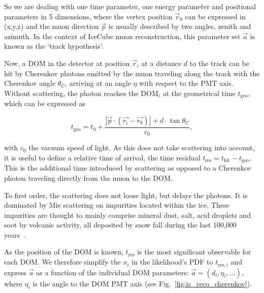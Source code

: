 So we are dealing with one time parameter, one energy parameter and positional parameters in 5 dimensions, where the vertex position $\vec{r}_0$ can be expressed in (x,y,z) and the muon direction $\vec{p}$ is usually described by two angles, zenith and azimuth. In the context of IceCube muon reconstruction, this parameter set $\vec{a}$ is known as the `track hypothesis'.

Now, a DOM in the detector at position $\vec{r}_i$ at a distance $d$ to the track can be hit by Cherenkov photons emitted by the muon traveling along the track with the Cherenkov angle $\theta_\text{C}$, arriving at an angle $\eta$ with respect to the PMT axis. Without scattering, the photon reaches the $\text{DOM}_i$ at the geometrical time $t_\text{geo}$, which can be expressed as

\begin{equation}
    t_\text{geo} = t_0 + \frac{|\vec{p}\cdot(\vec{r_i}-\vec{r_0})|+d\cdot \tan{\theta_\text{C}}}{c_0},
\end{equation}

with $c_0$ the vacuum speed of light. As this does not take scattering into account, it is useful to define a relative time of arrival, the time residual $t_\text{res} = t_\text{hit} - t_\text{geo}$. This is the additional time introduced by scattering as opposed to a Cherenkov photon traveling directly from the muon to the DOM\@.

To first order, the scattering does not loose light, but delays the photons. It is dominated by Mie scattering on impurities located within the ice. These impurities are thought to mainly comprise mineral dust, salt, acid droplets and soot by volcanic activity, all deposited by snow fall during the last 100,000 years~.

As the position of the DOM is known, $t_\text{res}$ is the most significant observable for each DOM. We therefore simplify the $x_i$ in the likelihood's PDF to $t_{\text{res},i}$ and express $\vec{a}$ as a function of the individual DOM parameters: $\vec{a}= (d_i,\eta_i,\ldots)$, where $\eta_i$ is the angle to the DOM PMT axis (see Fig.~\ref{fig:ic_reco_cherenkov}).


